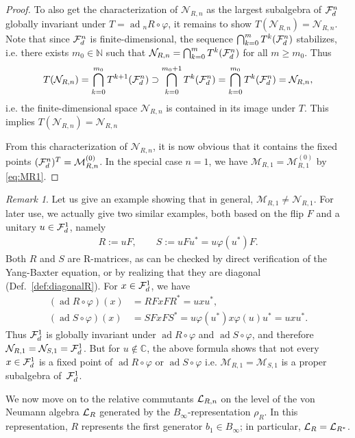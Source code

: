 \documentclass[12pt,a4paper]{amsart}
\numberwithin{equation}{section}
\theoremstyle{remark}
\newtheorem{remark}[theorem]{Remark}
\DeclareMathOperator{\ad}{ad}
\newcommand{\Cl}{\mathbb{C}}
\newcommand{\Nl}{\mathbb{N}}
\newcommand{\CM}[0]{\mathcal{M}} \newcommand{\CN}[0]{\mathcal{N}}
\begin{document}
\begin{proof}
 To also get the characterization of $\CN_{R,n}$ as the largest subalgebra of $\mathcal{F}_d^n$ globally invariant under $T=\ad{}_nR\circ\varphi$, it remains to show $T(\CN_{R,n})=\CN_{R,n}$. Note that since $\mathcal{F}_d^n$ is finite-dimensional, the sequence $\bigcap_{k=0}^mT^k(\mathcal{F}_d^n)$ stabilizes, i.e. there exists $m_0\in\Nl$ such that $\CN_{R,n}=\bigcap_{k=0}^{m}T^k(\CF_d^n)$ for all $m\geq m_0$. Thus
 \begin{align*}
  T(\CN_{R,n})
  =
  \bigcap_{k=0}^{m_0}T^{k+1}(\CF_d^n)
  \supset
  \bigcap_{k=0}^{m_0+1}T^{k}(\CF_d^n)
  =
  \bigcap_{k=0}^{m_0}T^{k}(\CF_d^n)
  =
  \CN_{R,n},
 \end{align*}
 i.e. the finite-dimensional space $\CN_{R,n}$ is contained in its image under $T$. This implies $T(\CN_{R,n})=\CN_{R,n}$
 
 From this characterization of $\CN_{R,n}$, it is now obvious that it contains the fixed points $(\CF_d^n)^T=\CM_{R,n}^{(0)}$. In the special case $n=1$, we have $\CM_{R,1}=\CM_{R,1}^{(0)}$ by \eqref{eq:MR1}.
\end{proof}

\begin{remark}\label{remark:N1andM1CanDiffer}
    Let us give an example showing that in general, $\CM_{R,1}\neq\CN_{R,1}$. For later use, we actually give two similar examples, both based on the flip $F$ and a unitary $u\in\mathcal{F}_d^1$, namely
    \begin{align*}
     R:=uF,\qquad S:=uFu^*=u\varphi(u^*)F.
    \end{align*}
    Both $R$ and $S$ are R-matrices, as can be checked by direct verification of the Yang-Baxter equation, or by realizing that they are diagonal (Def.~\ref{def:diagonalR}). For $x\in\mathcal{F}_d^1$, we have
    \begin{align*}
        (\ad R\circ\varphi)(x)&=RFxFR^*=uxu^*,\\
        (\ad S\circ\varphi)(x)&=SFxFS^*=u\varphi(u^*)x\varphi(u)u^*=uxu^*.
    \end{align*}
    Thus $\mathcal{F}_d^1$ is globally invariant under $\ad R\circ\varphi$ and $\ad S\circ\varphi$, and therefore $\CN_{R,1}=\CN_{S,1}=\CF_d^1$. But for $u\not\in\Cl$, the above formula shows that not every $x\in\mathcal{F}_d^1$ is a fixed point of $\ad R\circ\varphi$ or $\ad S\circ\varphi$ i.e. $\CM_{R,1}=\CM_{S,1}$ is a proper subalgebra of~$\mathcal{F}_d^1$.
\end{remark}

We now move on to the relative commutants $\mathcal{L}_{R,n}$ on the level of the von Neumann algebra $\mathcal{L}_R$ generated by the $B_\infty$-representation $\rho_R$. In this representation, $R$ represents the first generator $b_1\in B_\infty$; in particular, $\mathcal{L}_R=\mathcal{L}_{R^*}$. 
\end{document}
